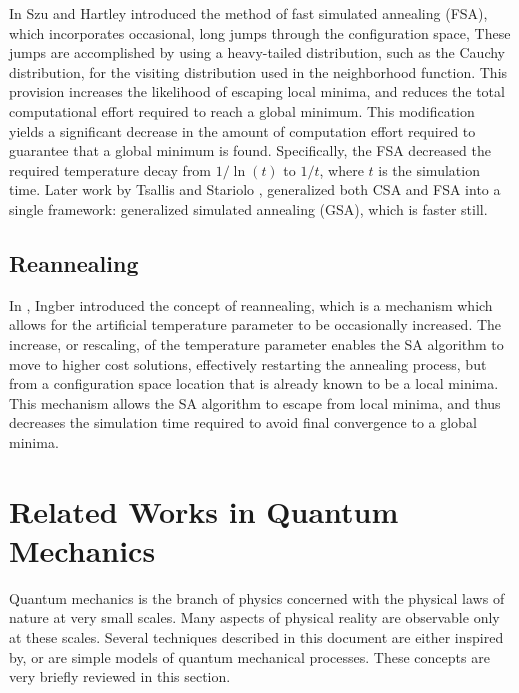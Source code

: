 \documentclass[11pt]{afthesis}
\begin{document}
	In \cite{szu1987fastsimulatedannealing} Szu and Hartley introduced the method of fast simulated annealing (FSA), which incorporates occasional, long jumps through the configuration space, These jumps are accomplished by using a heavy-tailed distribution, such as the Cauchy distribution, for the visiting distribution used in the neighborhood function. This provision increases the likelihood of escaping local minima, and reduces the total computational effort required to reach a global minimum. This modification yields a significant decrease in the amount of computation effort required to guarantee that a global minimum is found. Specifically, the FSA decreased the required temperature decay from $1/\ln(t)$ to $1/t$, where $t$ is the simulation time. Later work by Tsallis and Stariolo \cite{tsallis1996generalizedsimulatedannealing}, generalized both CSA and FSA into a single framework: generalized simulated annealing (GSA), which is faster still.
	
	\subsection{Reannealing}
	
	In \cite{ingber1989veryfastsimulatedreannealing}, Ingber introduced the concept of reannealing, which is a mechanism which allows for the artificial temperature parameter to be occasionally increased. The increase, or rescaling, of the temperature parameter enables the SA algorithm to move to higher cost solutions, effectively restarting the annealing process, but from a configuration space location that is already known to be a local minima. This mechanism allows the SA algorithm to escape from local minima, and thus decreases the simulation time required to avoid final convergence to a global minima.
	
	\section{Related Works in Quantum Mechanics}
	
	Quantum mechanics is the branch of physics concerned with the physical laws of nature at very small scales. Many aspects of physical reality are observable only at these scales. Several techniques described in this document are either inspired by, or are simple models of quantum mechanical processes. These concepts are very briefly reviewed in this section. 
	
\end{document}
